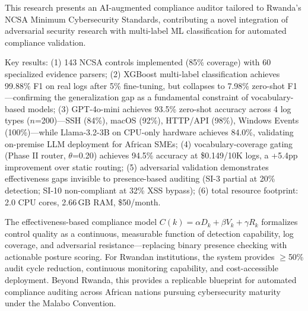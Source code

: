 \documentclass[futureinternet,article,submit,pdftex,moreauthors]{Definitions/mdpi}
\begin{document}
This research presents an AI-augmented compliance auditor tailored to Rwanda's NCSA Minimum
Cybersecurity Standards, contributing a novel integration of adversarial security research
with multi-label ML classification for automated compliance validation.

Key results: (1) 143 NCSA controls implemented (85\% coverage) with 60 specialized evidence
parsers; (2) XGBoost multi-label classification achieves 99.88\% F1 on real logs after 5\%
fine-tuning, but collapses to 7.98\% zero-shot F1---confirming the generalization gap as a
fundamental constraint of vocabulary-based models; (3) GPT-4o-mini achieves 93.5\% zero-shot
accuracy across 4 log types ($n$=200)---SSH (84\%), macOS (92\%), HTTP/API (98\%), Windows
Events (100\%)---while Llama-3.2-3B on CPU-only hardware achieves 84.0\%, validating
on-premise LLM deployment for African SMEs; (4) vocabulary-coverage gating (Phase II router,
$\theta$=0.20) achieves 94.5\% accuracy at \$0.149/10K logs, a +5.4pp improvement over static
routing; (5) adversarial validation demonstrates effectiveness gaps invisible to presence-based
auditing (SI-3 partial at 20\% detection; SI-10 non-compliant at 32\% XSS bypass);
(6) total resource footprint: 2.0 CPU cores, 2.66\,GB RAM, \$50/month.

The effectiveness-based compliance model $C(k) = \alpha D_k + \beta V_k + \gamma R_k$
formalizes control quality as a continuous, measurable function of detection capability, log
coverage, and adversarial resistance---replacing binary presence checking with actionable
posture scoring. For Rwandan institutions, the system provides $\geq$50\% audit cycle
reduction, continuous monitoring capability, and cost-accessible deployment. Beyond Rwanda,
this provides a replicable blueprint for automated compliance auditing across African nations
pursuing cybersecurity maturity under the Malabo Convention.

\vspace{6pt}

\end{document}
